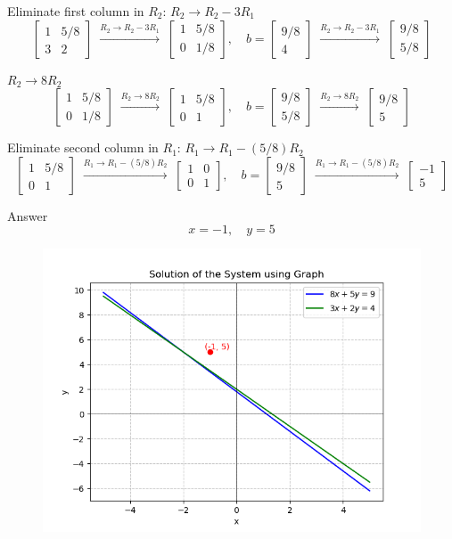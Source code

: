 \documentclass[journal]{IEEEtran}
\begin{document}
Eliminate first column in \(R_2\): \(R_2 \to R_2 - 3R_1\)
\[
\begin{bmatrix} 1 & 5/8 \\ 3 & 2 \end{bmatrix} 
\;\overset{R_2 \to R_2 - 3R_1}{\longrightarrow}\;
\begin{bmatrix} 1 & 5/8 \\ 0 & 1/8 \end{bmatrix}, \quad
b = \begin{bmatrix} 9/8 \\ 4 \end{bmatrix} 
\;\overset{R_2 \to R_2 - 3R_1}{\longrightarrow}\;
\begin{bmatrix} 9/8 \\ 5/8 \end{bmatrix}
\]

\(R_2 \to 8R_2\)
\[
\begin{bmatrix} 1 & 5/8 \\ 0 & 1/8 \end{bmatrix} 
\;\overset{R_2 \to 8R_2}{\longrightarrow}\;
\begin{bmatrix} 1 & 5/8 \\ 0 & 1 \end{bmatrix}, \quad
b = \begin{bmatrix} 9/8 \\ 5/8 \end{bmatrix} 
\;\overset{R_2 \to 8R_2}{\longrightarrow}\;
\begin{bmatrix} 9/8 \\ 5 \end{bmatrix}
\]

Eliminate second column in \(R_1\): \(R_1 \to R_1 - (5/8)R_2\)
\[
\begin{bmatrix} 1 & 5/8 \\ 0 & 1 \end{bmatrix} 
\;\overset{R_1 \to R_1 - (5/8)R_2}{\longrightarrow}\;
\begin{bmatrix} 1 & 0 \\ 0 & 1 \end{bmatrix}, \quad
b = \begin{bmatrix} 9/8 \\ 5 \end{bmatrix} 
\;\overset{R_1 \to R_1 - (5/8)R_2}{\longrightarrow}\;
\begin{bmatrix} -1 \\ 5 \end{bmatrix}
\]

 Answer 
\[
x = -1, \quad y = 5
\]
\begin{figure}[H]
\begin{center}
\includegraphics[width=0.6\columnwidth]{Figs/Fig1.png}
\end{center}
\caption{}
\label{fig:Fig.1}
\end{figure}
\end{document}

